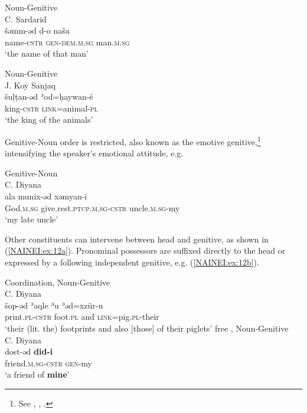 \documentclass[output=paper,colorlinks,citecolor=brown,draftmode]{langscibook}
\begin{document}
\ea\label{NAINEI:ex:9}
Noun-Genitive\\
C. Sardarid \citep[13:§5]{Younansardaroud2001Sardarid} \\
\gll šəmm-əd d-o naša \\
     name\textsc{-cstr} \textsc{gen-dem.m.sg} man\textsc{.m.sg} \\
\glt `the name of that man' 
\z

\ea\label{NAINEI:ex:10}
Noun-Genitive\\
J. Koy Sanjaq \citep[1B:§18]{Mutzafi2004Koya}\\
\gll šuḷṭan-əd ʾod=ḥaywan-é \\
     king\textsc{-cstr} \textsc{link=}animal\textsc{-pl} \\
\glt `the king of the animals' 
\z

Genitive-Noun order is restricted, also known as the emotive genitive,\footnote{See \citet{Hopkins2009emotiveGen}, \citet[100--102]{Cohen2012NENAZaxo}, \citet[143, 182,315]{Gutman2018AttNENA}.} intensifying the speaker's emotional attitude, e.g.

\ea\label{NAINEI:ex:11}
Genitive-Noun\\
C. Diyana \citep[18.1:§35]{Napiorkowska2015DiyanaZ} \\
\gll ala munix-əd xəmyan-i \\
     God\textsc{.m.sg} give.rest\textsc{.ptcp.m.sg-cstr} uncle\textsc{.m.sg-}my \\
\glt `my late uncle' 
\z

Other constituents can intervene between head and genitive, as shown in (\ref{NAINEI:ex:12a}). Pronominal possessors are suffixed directly to the head or expressed by a following independent genitive, e.g. (\ref{NAINEI:ex:12b}). 

\ea
\ea\label{NAINEI:ex:12a}
Coordination, Noun-Genitive\\
C. Diyana \citep[18.7:§16]{Napiorkowska2015DiyanaZ}\\
\gll šop-əd ʾaqle ʾu ʾəd=xzür-u \\
     print\textsc{.pl-cstr} foot\textsc{.pl} and \textsc{link=}pig\textsc{.pl-}their \\
\glt `their (lit. the) footprints and also [those] of their piglets' 
\ex\label{NAINEI:ex:12b}
free , Noun-Genitive\\
C. Diyana \citep[18.6:§7]{Napiorkowska2015DiyanaZ}  \\
\gll dost-əd \textbf{did-i} \\
     friend\textsc{.m.sg-cstr} \textsc{gen-}my  \\
\glt `a friend of \textbf{mine}' 
\z
\z
\end{document}
